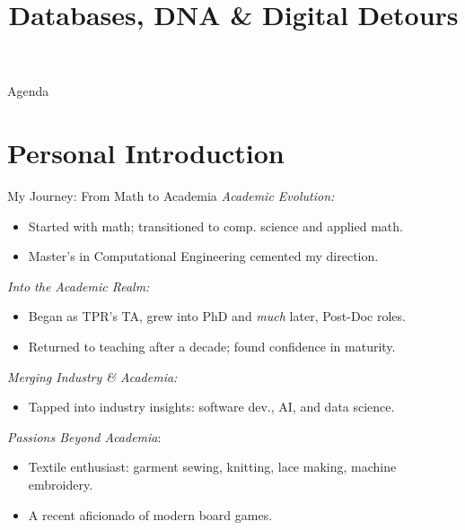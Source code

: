 \documentclass[
    NAME={Dr. Helga Ingimundardóttir},
    EMAIL={helgaingim@hi.is},
    FACULTY={Industrial Engineering},
    SUBTITLE={From Smart Algorithms in Fish Portioning to Pioneering Pipelines in Long-Range DNA Sequencing and Digital Travel},
    SEMINAR={IVT Faculty Gathering},
    DATE={September 6, 2023}
]{hi-latex/hi-beamer}
\title{Databases, DNA \& Digital Detours}
\begin{document}
\begin{frame}{Agenda}
\tableofcontents
\end{frame}

\section{Personal Introduction}

\begin{frame}{My Journey: From Math to Academia}
\emph{Academic Evolution:}
\begin{itemize}
    \item Started with math; transitioned to comp. science and applied math.
    \item Master's in Computational Engineering cemented my direction.
\end{itemize}

\emph{Into the Academic Realm:}
\begin{itemize}
    \item Began as TPR's TA, grew into PhD and \textit{much} later, Post-Doc roles.
    \item Returned to teaching after a decade; found confidence in maturity.
\end{itemize}

\emph{Merging Industry \& Academia:}
\begin{itemize}
    \item Tapped into industry insights: software dev., AI, and data science.
\end{itemize}

\emph{Passions Beyond Academia}:
\begin{itemize}
    \item Textile enthusiast: garment sewing, knitting, lace making, machine embroidery.
    \item A recent aficionado of modern board games.
\end{itemize}
\end{frame}
\end{document}

